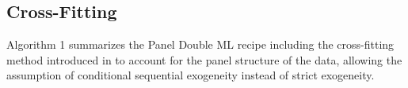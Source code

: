 \subsection*{Cross-Fitting}
Algorithm 1 summarizes the Panel Double ML recipe including the cross-fitting method introduced in \cite{PanelDML} to account for the panel structure of the data, allowing the assumption of conditional sequential exogeneity instead of strict exogeneity.

\subsection*{}
